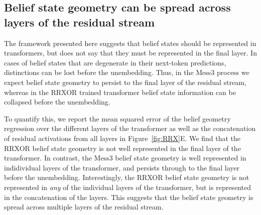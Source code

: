 \documentclass{article}
\begin{document}
\subsection{Belief state geometry can be spread across layers of the residual stream}

The framework presented here suggests that belief states should be represented in transformers, but does not say that they must be represented in the final layer. In cases of belief states that are degenerate in their next-token predictions, distinctions can be lost before the unembedding. Thus, in the Mess3 process we expect belief state geometry to persist to the final layer of the residual stream, whereas in the RRXOR trained transformer belief state information can be collapsed before the unembedding. 

To quantify this, we report the mean squared error of the belief geometry regression over the different layers of the transformer as well as the concatenation of residual activations from all layers in Figure~\ref{fig:RRX}E. We find that the RRXOR belief state geometry is not well represented in the final layer of the transformer.
In contrast, the  Mess3 belief state geometry is well represented in indidividual layers of the transformer, and persists through to the final layer before the unembedding. 
Interestingly, the RRXOR belief state geometry is not represented in \emph{any} of the individual layers of the transformer, but is represented in the concatenation of the layers. This suggests that the belief state geometry is spread across multiple layers of the residual stream.

\end{document}
